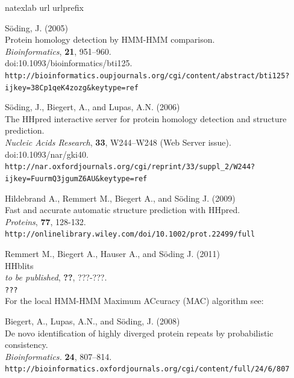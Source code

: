 \documentclass[11pt,a4paper]{article}
\begin{document}
\begin{thebibliography}{31}

\expandafter\ifx\csname natexlab\endcsname\relax\def\natexlab#1{#1}\fi
\expandafter\ifx\csname url\endcsname\relax
  \def\url#1{\texttt{#1}}\fi
\expandafter\ifx\csname urlprefix\endcsname\relax\def\urlprefix{URL }\fi

S\"oding, J. (2005)\\
{Protein homology detection by HMM-HMM comparison.}\\
\newblock \emph{Bioinformatics}, \textbf{21}, 951--960.\\
\newblock doi:10.1093/bioinformatics/bti125.\\
\newblock \url{http://bioinformatics.oupjournals.org/cgi/content/abstract/bti125?ijkey=38Cp1qeK4zozg&keytype=ref}

S\"oding, J., Biegert, A., and Lupas, A.N. (2006)\\
{The HHpred interactive server for protein homology detection and structure prediction.}\\
\newblock \emph{Nucleic Acids Research}, \textbf{33}, W244--W248 (Web Server issue).\\
\newblock doi:10.1093/nar/gki40.\\
\newblock \url{http://nar.oxfordjournals.org/cgi/reprint/33/suppl_2/W244?ijkey=FuurmQ3jgumZ6AU&keytype=ref}

Hildebrand A., Remmert M., Biegert A., and S\"oding J. (2009)\\
{Fast and accurate automatic structure prediction with HHpred.}\\
\newblock \emph{Proteins}, \textbf{77}, 128-132.\\
\newblock \url{http://onlinelibrary.wiley.com/doi/10.1002/prot.22499/full}

Remmert M., Biegert A., Hauser A., and S\"oding J. (2011)\\
{HHblits}\\
\newblock \emph{to be published}, \textbf{??}, ???-???.\\
\newblock \url{???}
\\[1mm]

\noindent For the local HMM-HMM Maximum ACcuracy (MAC) algorithm see:

Biegert, A., Lupas, A.N., and S\"oding, J. (2008)\\
{De novo identification of highly diverged protein repeats by probabilistic consistency.}\\
\newblock \emph{Bioinformatics.} \textbf{24}, 807--814.\\
\newblock \url{http://bioinformatics.oxfordjournals.org/cgi/content/full/24/6/807}

\end{thebibliography}
\end{document}

